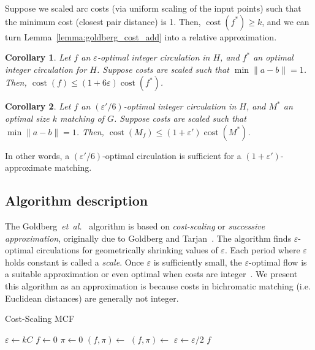 \documentclass[11pt]{article}
\def\etal{\textsl{et~al.}}
\def\eps{\varepsilon}
\theoremstyle{plain}
\newtheorem{corollary}{Corollary}
\def\cost{\operatorname{cost}}
\begin{document}
Suppose we scaled arc costs (via uniform scaling of the input points) such that
the minimum cost (closest pair distance) is 1.
Then, $\cost(f^*) \geq k$, and we can turn Lemma~\ref{lemma:goldberg_cost_add}
into a relative approximation.

\begin{corollary}
\label{corollary:flow_approx}
	Let $f$ an $\eps$-optimal integer circulation in $H$, and $f^*$ an
	optimal integer circulation for $H$.
	Suppose costs are scaled such that $\min \|a - b\| = 1$.
	Then, $\cost(f) \leq (1 + 6\eps) \cost(f^*)$.
\end{corollary}

\begin{corollary}
\label{corollary:match_approx}
	Let $f$ an $(\eps'/6)$-optimal integer circulation in $H$, and $M^*$ an
	optimal size $k$ matching of $G$.
	Suppose costs are scaled such that $\min \|a - b\| = 1$.
	Then, $\cost(M_f) \leq (1 + \eps') \cost(M^*)$.
\end{corollary}

In other words, a $(\eps'/6)$-optimal circulation is sufficient for a
$(1 + \eps')$-approximate matching.

\subsection{Algorithm description}

The Goldberg~{\etal}~\cite{GHKT17} algorithm is based on \emph{cost-scaling} or
\emph{successive approximation}, originally due to Goldberg and
Tarjan~\cite{GT90}.
The algorithm finds $\eps$-optimal circulations for geometrically shrinking
values of $\eps$.
Each period where $\eps$ holds constant is called a \emph{scale}.
Once $\eps$ is sufficiently small, the $\eps$-optimal flow is a suitable
approximation or even optimal when costs are integer~\cite{GT90,GHKT17}.
We present this algorithm as an approximation is because costs in bichromatic
matching (i.e. Euclidean distances) are generally not integer.

\begin{algorithm}
\caption{Cost-Scaling MCF}
\begin{algorithmic}[1]
\Function{MCF}{$H$, $\eps'$}
	\State $\eps \gets kC$
	\State $f \gets 0$
	\State $\pi \gets 0$
	\Repeat
		\State $(f, \pi) \gets$ 
		\State $(f, \pi) \gets$ 
		\State $\eps \gets \eps/2$
	\Until{$\eps \leq \eps'/6$}
	\State\Return $f$
\EndFunction
\end{algorithmic}
\end{algorithm}
\end{document}
